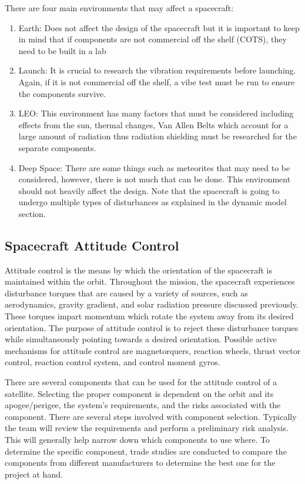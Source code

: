 \documentclass{article}
\begin{document}
There are four main environments that may affect a spacecraft:
\begin{enumerate}[itemsep=-5pt]
\item Earth: Does not affect the design of the spacecraft but it is
  important to keep in mind that if components are not commercial off
  the shelf (COTS), they need to be built in a lab 
\item Launch: It is crucial to research the vibration requirements
  before launching. Again, if it is not commercial off the shelf, a
  vibe test must be run to ensure the components survive.  
\item LEO: This environment has many factors that must be considered
  including effects from the sun, thermal changes, Van Allen Belts
  which account for a large amount of radiation thus radiation
  shielding must be researched for the separate components. 
\item Deep Space: There are some things such as meteorites that may
  need to be considered, however, there is not much that can be
  done. This environment should not heavily affect the design.
Note that the spacecraft is going to undergo multiple types of
disturbances as explained in the dynamic model section.
\end{enumerate}

\subsection{Spacecraft Attitude Control}

Attitude control is the means by which the orientation of the
spacecraft is maintained within the orbit. Throughout the mission, the
spacecraft experiences disturbance torques that are caused by a
variety of sources, such as aerodynamics, gravity gradient, and solar
radiation pressure discussed previously. These torques impart momentum
which rotate the system away from its desired orientation. The purpose
of attitude control is to reject these disturbance torques while
simultaneously pointing towards a desired orientation. Possible active
mechanisms for attitude control are magnetorquers, reaction wheels,
thrust vector control, reaction control system, and control moment
gyros.

There are several components that can be used for the attitude control
of a satellite. Selecting the proper component is dependent on the
orbit and its apogee/perigee, the system's requirements, and the risks
associated with the component. There are several steps involved with
component selection. Typically the team will review the requirements
and perform a preliminary risk analysis. This will generally help
narrow down which components to use where. To determine the specific
component, trade studies are conducted to compare the components from
different manufacturers to determine the best one for the project at
hand.
\end{document}
